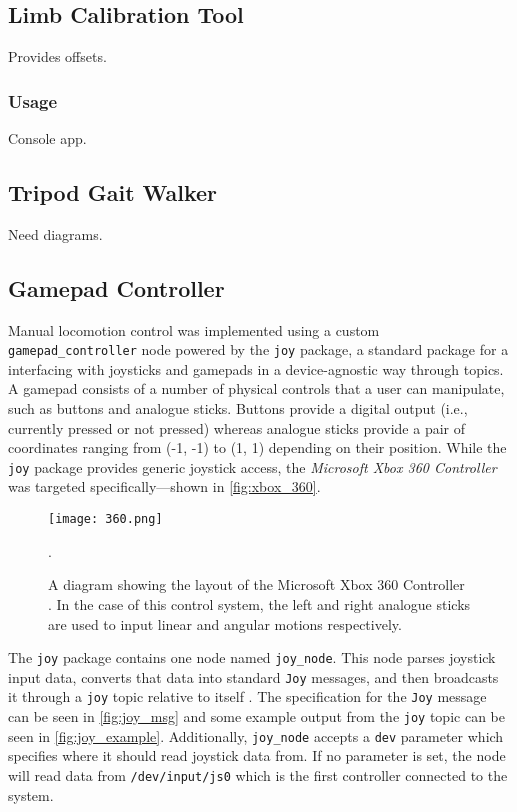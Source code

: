\subsection{Limb Calibration Tool}

Provides offsets.

\subsubsection{Usage}

Console app.

\subsection{Tripod Gait Walker}

Need diagrams.

\subsection{Gamepad Controller}

Manual locomotion control was implemented using a custom \texttt{gamepad\_controller} node powered by the \texttt{joy} package, a standard package for a interfacing with joysticks and gamepads in a device-agnostic way through topics. A gamepad consists of a number of physical controls that a user can manipulate, such as buttons and analogue sticks. Buttons provide a digital output (i.e., currently pressed or not pressed) whereas analogue sticks provide a pair of coordinates ranging from (-1, -1) to (1, 1) depending on their position. While the \texttt{joy} package provides generic joystick access, the \emph{Microsoft Xbox 360 Controller} was targeted specifically---shown in \autoref{fig:xbox_360}.

\begin{figure}[!h]
	\centering
	\texttt{[image: 360.png]}
	\caption{A diagram showing the layout of the Microsoft Xbox 360 Controller \cite{360_controller}. In the case of this control system, the left and right analogue sticks are used to input linear and angular motions respectively.}.
	\label{fig:xbox_360}
\end{figure}

The \texttt{joy} package contains one node named \texttt{joy\_node}. This node parses joystick input data, converts that data into standard \texttt{Joy} messages, and then broadcasts it through a \texttt{joy} topic relative to itself \cite{ros_wiki_joy}. The specification for the \texttt{Joy} message can be seen in \autoref{fig:joy_msg} and some example output from the \texttt{joy} topic can be seen in \autoref{fig:joy_example}. Additionally, \texttt{joy\_node} accepts a \texttt{dev} parameter which specifies where it should read joystick data from. If no parameter is set, the node will read data from \texttt{/dev/input/js0} which is the first controller connected to the system. 

